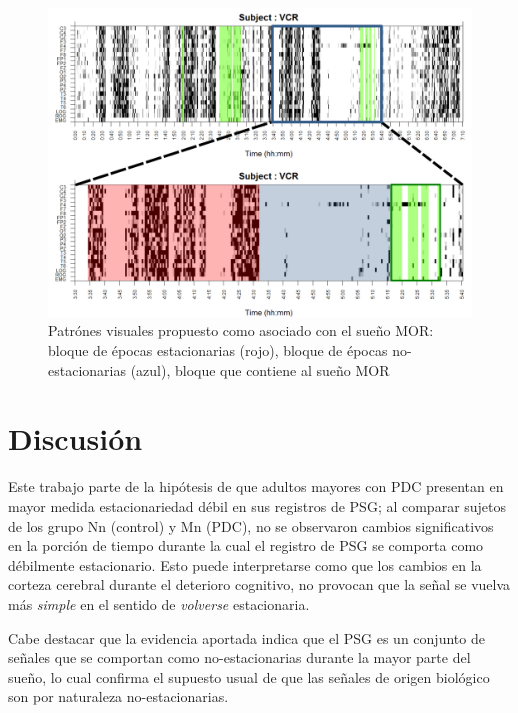 \begin{figure}
\includegraphics[width=\textwidth]
{./img_ejemplos/zoom_VCR.pdf}
\caption{Patrónes visuales propuesto como asociado con el sueño MOR: bloque de épocas estacionarias 
(rojo), bloque de épocas no-estacionarias (azul), bloque que contiene al sueño MOR}
\label{patroncito}
\end{figure}


\section{Discusión}

Este trabajo parte de la hipótesis de que adultos mayores con PDC presentan en mayor medida 
estacionariedad débil en sus registros de PSG; al comparar sujetos de los grupo Nn (control) y Mn 
(PDC), no se observaron cambios significativos en la porción de tiempo durante la cual el registro 
de PSG se comporta como débilmente estacionario. 
Esto puede interpretarse como que los cambios en la corteza cerebral durante el deterioro 
cognitivo, no provocan que  la señal se vuelva más \textit{simple} en el sentido de 
\textit{volverse} estacionaria.

Cabe destacar que la evidencia aportada indica que el PSG es un conjunto de señales que se comportan
como no-estacionarias durante la mayor parte del sueño, lo cual confirma el supuesto usual de que 
las señales de origen biológico son por naturaleza no-estacionarias. 


